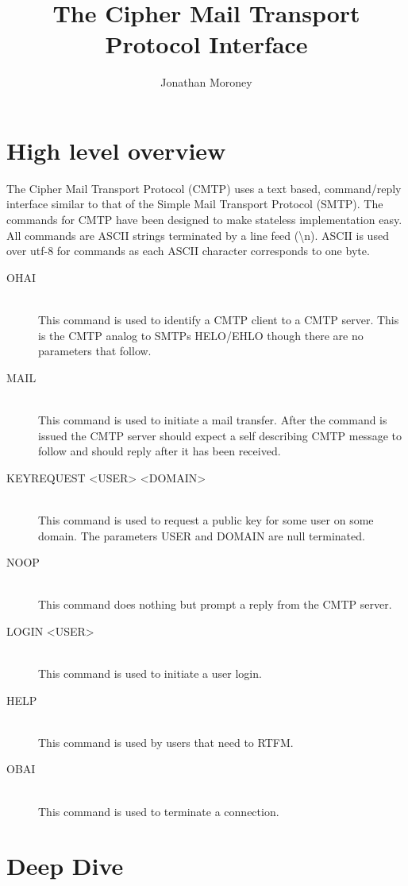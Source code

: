 \documentclass[a4paper,11pt]{article}
\title{The Cipher Mail Transport Protocol Interface}
\author{Jonathan Moroney}
\begin{document}
\maketitle
\tableofcontents


\section{High level overview}
The Cipher Mail Transport Protocol (CMTP) uses a text based, command/reply interface similar to that of the Simple Mail Transport Protocol (SMTP). The commands for CMTP have been designed to make stateless implementation easy. All commands are ASCII strings terminated by a line feed (\textbackslash n). ASCII is used over utf-8 for commands as each ASCII character corresponds to one byte.
\begin{description}
  \item [OHAI] \hfill \\
  This command is used to identify a CMTP client to a CMTP server. This is the CMTP analog to SMTPs HELO/EHLO though there are no parameters that follow.
  \item [MAIL] \hfill \\
  This command is used to initiate a mail transfer. After the command is issued the CMTP server should expect a self describing CMTP message to follow and should reply after it has been received.
  \item [KEYREQUEST <USER> <DOMAIN>] \hfill \\
  This command is used to request a public key for some user on some domain. The parameters USER and DOMAIN are null terminated.
  \item [NOOP] \hfill \\
  This command does nothing but prompt a reply from the CMTP server.
  \item [LOGIN <USER>] \hfill \\
  This command is used to initiate a user login.
  \item [HELP] \hfill \\
  This command is used by users that need to RTFM.
  \item [OBAI] \hfill \\
  This command is used to terminate a connection.
\end{description}

\section{Deep Dive}
\end{document}
